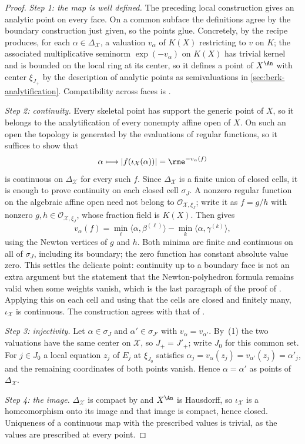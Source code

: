 \begin{proof}
\emph{Step 1: the map is well defined.} The preceding local construction
gives an analytic point on every face.
On a common subface the definitions agree by the boundary construction just
given, so the points glue. Concretely, by  the
recipe produces, for each $\alpha\in\Delta_{\mathcal X}$, a valuation
$v_\alpha$ of $K(X)$ restricting to $v$ on $K$; the associated
multiplicative seminorm $\exp(-v_\alpha)$ on $K(X)$ has trivial kernel
and is bounded on the local ring at its center, so it defines a point of
$X^{\An}$ with center $\xi_{J_+}$ by the description of analytic points
as semivaluations in \cref{sec:berk-analytification}. Compatibility across
faces is .

\emph{Step 2: continuity.} Every skeletal point has support the generic
point of $X$, so it belongs to the analytification of every nonempty
affine open of $X$. On such an open the topology is generated by the
evaluations of regular functions, so it suffices to show that
\[
                   \alpha\longmapsto |f(\iota_{\mathcal X}(\alpha))|
                   =\rme^{-v_\alpha(f)}
\]
is continuous on $\Delta_{\mathcal X}$ for every such $f$. Since
$\Delta_{\mathcal X}$ is a finite union of closed cells, it is enough to
prove continuity on each closed cell $\sigma_J$. A nonzero regular
function on the algebraic affine open need not belong to
$\mathcal O_{\mathcal X,\xi_J}$; write it as $f=g/h$ with nonzero
$g,h\in\mathcal O_{\mathcal X,\xi_J}$, whose fraction field is $K(X)$.
Then  gives
\[
 v_\alpha(f)
 =\min_\ell\langle\alpha,\beta^{(\ell)}\rangle
  -\min_k\langle\alpha,\gamma^{(k)}\rangle,
\]
using the Newton vertices of $g$ and $h$. Both minima are finite and
continuous on all of $\sigma_J$, including its boundary; the zero function
has constant absolute value zero. This settles the delicate point:
continuity up to a boundary face is not an extra argument but the statement
that the Newton-polyhedron formula remains valid when some weights vanish,
which is the last paragraph of the proof of .
Applying this on each cell and using that the cells are closed and finitely
many, $\iota_{\mathcal X}$ is continuous. The construction agrees with
that of \cite[Sections~3.1--3.2]{BFJ16}.

\emph{Step 3: injectivity.} Let $\alpha\in\sigma_J$ and
$\alpha'\in\sigma_{J'}$ with $v_\alpha=v_{\alpha'}$. By
\,(1) the two valuations have the
same center on $\mathcal X$, so $J_+=J'_+$; write $J_0$ for this
common set. For $j\in J_0$ a local equation $z_j$ of $E_j$ at
$\xi_{J_0}$ satisfies $\alpha_j=v_\alpha(z_j)=v_{\alpha'}(z_j)=\alpha'_j$,
and the remaining coordinates of both points vanish. Hence
$\alpha=\alpha'$ as points of $\Delta_{\mathcal X}$.

\emph{Step 4: the image.} $\Delta_{\mathcal X}$ is compact by
 and $X^{\An}$ is Hausdorff, so
$\iota_{\mathcal X}$ is a homeomorphism onto its image and that image is
compact, hence closed. Uniqueness of a continuous map with the prescribed
values is trivial, as the values are prescribed at every point.
\end{proof}
